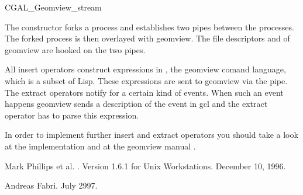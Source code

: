 \begin{ccClass}{CGAL_Geomview_stream}
\ccImplementation

The constructor forks a process and establishes two pipes between the
processes. The forked process is then overlayed with geomview. The
file descriptors  and  of geomview are hooked
on the two pipes.

All insert operators construct expressions in , the geomview
comand language, which is a subset of {\sc Lisp}. These expressions
are sent to geomview via the pipe. The extract operators notify 
for a certain kind of events. When such an event happens geomview
sends a description of the event in gcl and the extract operator has
to parse this expression.

In order to implement further insert and extract operators you should
take a look at the implementation \cite{GV_Impl} and at the geomview
manual \cite{GVManual}.
\end{ccClass}

\begin{thebibliography}{10}

Mark Phillips et al.
.
\newblock Version 1.6.1 for Unix Workstations.
\newblock December 10, 1996.


Andreas Fabri.
\newblock July 2997.
\end{thebibliography}

